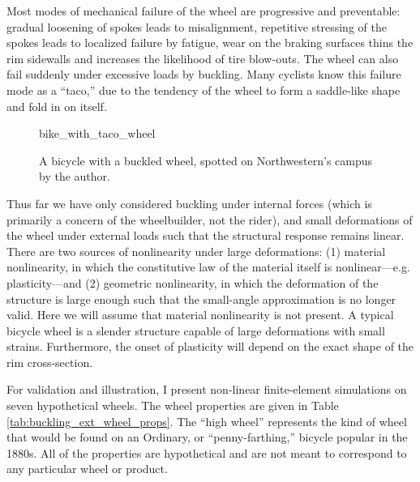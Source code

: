 \documentclass[\rootdir/thesis.tex]{subfiles}
\begin{document}
Most modes of mechanical failure of the wheel are progressive and preventable: gradual loosening of spokes leads to misalignment, repetitive stressing of the spokes leads to localized failure by fatigue, wear on the braking surfaces thins the rim sidewalls and increases the likelihood of tire blow-outs. The wheel can also fail suddenly under excessive loads by buckling. Many cyclists know this failure mode as a ``taco,'' due to the tendency of the wheel to form a saddle-like shape and fold in on itself.

\begin{figure}
\centering
{bike_with_taco_wheel}
\caption{A bicycle with a buckled wheel, spotted on Northwestern's campus by the author.}
\label{fig:bike_taco_wheel}
\end{figure}

Thus far we have only considered buckling under internal forces (which is primarily a concern of the wheelbuilder, not the rider), and small deformations of the wheel under external loads such that the structural response remains linear. There are two sources of nonlinearity under large deformations: (1) material nonlinearity, in which the constitutive law of the material itself is nonlinear---e.g. plasticity---and (2) geometric nonlinearity, in which the deformation of the structure is large enough such that the small-angle approximation is no longer valid. Here we will assume that material nonlinearity is not present. A typical bicycle wheel is a slender structure capable of large deformations with small strains. Furthermore, the onset of plasticity will depend on the exact shape of the rim cross-section.

For validation and illustration, I present non-linear finite-element simulations on seven hypothetical wheels. The wheel properties are given in Table \ref{tab:buckling_ext_wheel_props}. The ``high wheel'' represents the kind of wheel that would be found on an Ordinary, or ``penny-farthing,'' bicycle popular in the 1880s. All of the properties are hypothetical and are not meant to correspond to any particular wheel or product.
\end{document}

